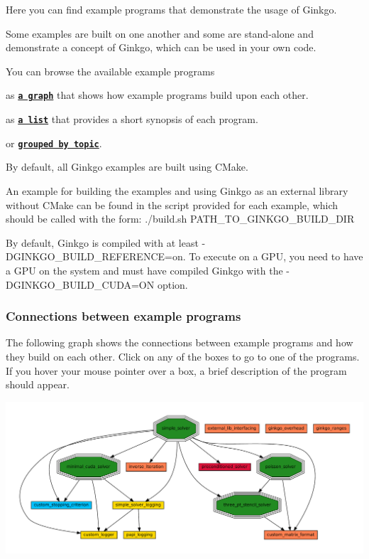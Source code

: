 Here you can find example programs that demonstrate the usage of Ginkgo.

Some examples are built on one another and some are stand-\/alone and demonstrate a concept of Ginkgo, which can be used in your own code.

You can browse the available example programs 
\begin{DoxyEnumerate}
\item as {\bfseries \href{#graph}{\tt a graph}} that shows how example programs build upon each other. 
\item as {\bfseries \href{#list}{\tt a list}} that provides a short synopsis of each program. 
\item or {\bfseries \href{#topic}{\tt grouped by topic}}. 
\end{DoxyEnumerate}

By default, all Ginkgo examples are built using C\+Make.

An example for building the examples and using Ginkgo as an external library without C\+Make can be found in the script provided for each example, which should be called with the form\+: {\ttfamily ./build.sh P\+A\+T\+H\+\_\+\+T\+O\+\_\+\+G\+I\+N\+K\+G\+O\+\_\+\+B\+U\+I\+L\+D\+\_\+\+D\+IR }

By default, Ginkgo is compiled with at least {\ttfamily -\/\+D\+G\+I\+N\+K\+G\+O\+\_\+\+B\+U\+I\+L\+D\+\_\+\+R\+E\+F\+E\+R\+E\+N\+CE=on}. To execute on a G\+PU, you need to have a G\+PU on the system and must have compiled Ginkgo with the {\ttfamily -\/\+D\+G\+I\+N\+K\+G\+O\+\_\+\+B\+U\+I\+L\+D\+\_\+\+C\+U\+DA=ON} option.

\label{_graph}%
 \label{Examples_ExampleConnectionGraph}%
%
 \subsubsection*{Connections between example programs}

The following graph shows the connections between example programs and how they build on each other. Click on any of the boxes to go to one of the programs. If you hover your mouse pointer over a box, a brief description of the program should appear. 
\begin{DoxyImageNoCaption}
  \mbox{\includegraphics[width=\textwidth,height=\textheight/2,keepaspectratio=true]{dot_inline_dotgraph_1}}
\end{DoxyImageNoCaption}



